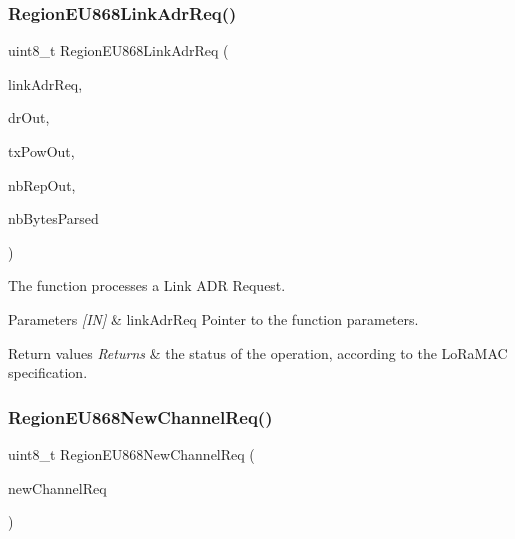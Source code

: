 \subsubsection{\texorpdfstring{Region\+E\+U868\+Link\+Adr\+Req()}{RegionEU868LinkAdrReq()}}
{\footnotesize\ttfamily uint8\+\_\+t Region\+E\+U868\+Link\+Adr\+Req (\begin{DoxyParamCaption}\item[{\hyperlink{group__REGION_gad4af503e8d4de1846129e26a799a1e8e}{Link\+Adr\+Req\+Params\+\_\+t} $\ast$}]{link\+Adr\+Req,  }\item[{int8\+\_\+t $\ast$}]{dr\+Out,  }\item[{int8\+\_\+t $\ast$}]{tx\+Pow\+Out,  }\item[{uint8\+\_\+t $\ast$}]{nb\+Rep\+Out,  }\item[{uint8\+\_\+t $\ast$}]{nb\+Bytes\+Parsed }\end{DoxyParamCaption})}



The function processes a Link A\+DR Request. 


\begin{DoxyParams}{Parameters}
{\em \mbox{[}\+I\+N\mbox{]}} & link\+Adr\+Req Pointer to the function parameters.\\
\hline
\end{DoxyParams}

\begin{DoxyRetVals}{Return values}
{\em Returns} & the status of the operation, according to the Lo\+Ra\+M\+AC specification. \\
\hline
\end{DoxyRetVals}
\mbox{\label{group__REGIONEU868_ga4325b111d5f14ddc4b33f5e827a8986e}} 
\subsubsection{\texorpdfstring{Region\+E\+U868\+New\+Channel\+Req()}{RegionEU868NewChannelReq()}}
{\footnotesize\ttfamily uint8\+\_\+t Region\+E\+U868\+New\+Channel\+Req (\begin{DoxyParamCaption}\item[{\hyperlink{group__REGION_gae2abcdb6dbb843c9faf5fd3009eca9d6}{New\+Channel\+Req\+Params\+\_\+t} $\ast$}]{new\+Channel\+Req }\end{DoxyParamCaption})}



